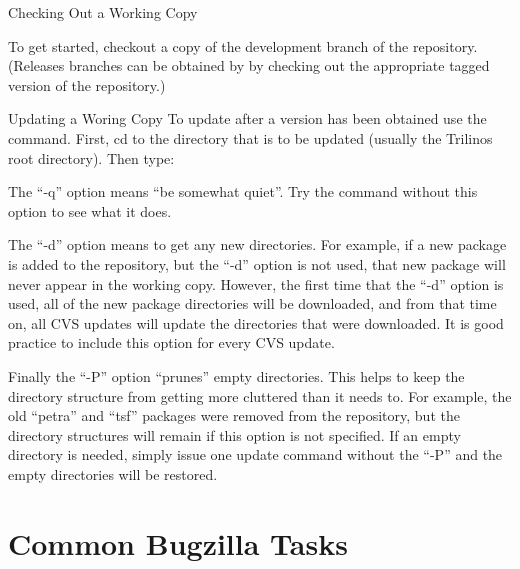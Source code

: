 \documentclass[12pt,relax]{TrilinosDevGuide}
\begin{document}
Checking Out a Working Copy

To get started, checkout a copy of the development branch of the repository.
(Releases branches can be obtained by by checking out the appropriate 
tagged version of the repository.)


Updating a Woring Copy
To update after a version has been obtained use the  
command.  First, cd to the directory that is to be updated 
(usually the Trilinos root directory).  Then type:


The ``-q'' option means ``be somewhat quiet''.  Try the command without this
option to see what it does.  

The ``-d'' option means to get any new directories.  For example, if a new 
package is added to the repository, but the ``-d'' option is not used, that 
new package will never appear in the working copy.  However, the first time 
that the ``-d'' option is used, all of the new package directories will be 
downloaded, and from that time on, all CVS updates will update the 
directories that were downloaded.  It is good practice to include this 
option for every CVS update.

Finally the ``-P'' option ``prunes'' empty directories.  This helps to keep 
the directory structure from getting more cluttered than it needs to.  For 
example, the old ``petra'' and ``tsf'' packages were removed from the 
repository, but the directory structures will remain if this option is not 
specified.  If an empty directory is needed, simply issue one update 
command without the ``-P'' and the empty directories will be restored.


\section{Common Bugzilla Tasks}
\label{Section:Bugzilla}
\end{document}
